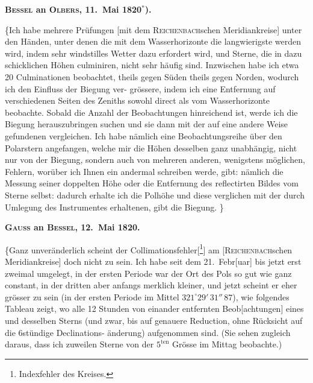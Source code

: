\documentclass[12pt,a4paper]{article}
\theoremstyle{plain}
\theoremstyle{definition}
\theoremstyle{remark}
\begin{document}
\medskip
\begin{center}
\textbf{\textsc{Bessel} an \textsc{Olbers}, 11.\ Mai 1820$^*$).}
\end{center}

\medskip
\{\dotfill Ich habe mehrere Pr\"{u}fungen [mit dem \textsc{Reichenbach}schen
Meridiankreise] unter den H\"{a}nden, unter denen die mit dem Wasserhorizonte
die langwierigste werden wird, indem sehr windstilles Wetter dazu erfordert
wird, und Sterne, die in dazu schicklichen H\"{o}hen culminiren, nicht sehr
h\"{a}ufig sind. Inzwischen habe ich etwa 20 Culminationen beobachtet, theils
gegen S\"{u}den theils gegen Norden, wodurch ich den Einfluss der Biegung ver-
gr\"{o}ssere, indem ich eine Entfernung auf verschiedenen Seiten des Zeniths
sowohl direct als vom Wasserhorizonte beobachte. Sobald die Anzahl der
Beobachtungen hinreichend ist, werde ich die Biegung herauszubringen suchen
und sie dann mit der auf eine andere Weise gefundenen vergleichen. Ich
habe n\"{a}mlich eine Beobachtungsreihe \"{u}ber den Polarstern angefangen, welche
mir die H\"{o}hen desselben ganz unabh\"{a}ngig, nicht nur von der Biegung, sondern
auch von mehreren anderen, wenigstens m\"{o}glichen, Fehlern, wor\"{u}ber ich Ihnen
ein andermal schreiben werde, gibt: n\"{a}mlich die Messung seiner doppelten
H\"{o}he oder die Entfernung des reflectirten Bildes vom Sterne selbst: dadurch
erhalte ich die Polh\"{o}he und diese verglichen mit der durch Umlegung des
Instrumentes erhaltenen, gibt die Biegung. \dotfill\}

\medskip
\begin{center}
\textbf{\textsc{Gauss} an \textsc{Bessel}, 12.\ Mai 1820.}
\end{center}

\medskip
\{\dotfill Ganz unver\"{a}nderlich scheint der Collimationsfehler[\footnote{Indexfehler des Kreises.}]
am [\textsc{Reichenbach}schen Meridiankreise] doch nicht zu sein. Ich habe seit dem
21.\ Febr[uar] bis jetzt erst zweimal umgelegt, in der ersten Periode war der
Ort des Pols so gut wie ganz constant, in der dritten aber anfangs merklich
kleiner, und jetzt scheint er eher gr\"{o}sser zu sein (in der ersten Periode im
Mittel $321^\circ 29'\,31''\,87$), wie folgendes Tableau zeigt, wo alle 12 Stunden von
einander entfernten Beob[achtungen] eines und desselben Sterns (und zwar, bis
auf genauere Reduction, ohne R\"{u}cksicht auf die 6st\"{u}ndige Declinations-
\"{a}nderung) aufgenommen sind. (Sie sehen zugleich daraus, dass ich zuweilen
Sterne von der $5^{\mathrm{ten}}$ Gr\"{o}sse im Mittag beobachte.)
\end{document}
